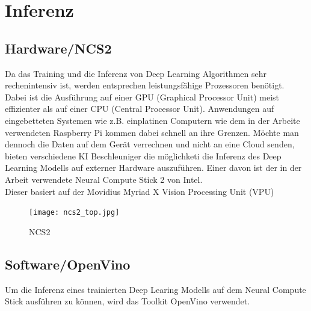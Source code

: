 \section{Inferenz}\label{sec:hardware}

\subsection{Hardware/NCS2}
Da das Training und die Inferenz von Deep Learning Algorithmen
 sehr rechenintensiv ist, werden entsprechen leistungsfähige 
Prozessoren benötigt. Dabei ist die Ausführung auf einer GPU 
(Graphical Processor Unit) meist effizienter als auf einer 
CPU (Central Processor Unit). Anwendungen auf eingebetteten Systemen
wie z.B. einplatinen Computern wie dem in der Arbeite verwendeten
Raspberry Pi kommen dabei schnell an ihre Grenzen.
Möchte man dennoch die Daten auf dem Gerät verrechnen und 
nicht an eine Cloud senden, bieten verschiedene KI Beschleuniger 
die möglichketi die Inferenz des Deep Learning Modells 
auf externer Hardware auszuführen. Einer davon ist der in der 
Arbeit verwendete Neural Compute Stick 2 von Intel.
\\
Dieser basiert auf der Movidius Myriad X Vision Processing Unit (VPU)
\cite{haussermannFunktionUndEffizienz}

\begin{figure}[htb]
    \centering
    \label{fig:ncs2}
    \texttt{[image: ncs2\_top.jpg]}
    \caption{NCS2}
\end{figure}

\subsection{Software/OpenVino}






Um die Inferenz eines trainierten Deep Learing Modells auf dem
Neural Compute Stick ausführen zu können, wird das Toolkit 
OpenVino verwendet.

